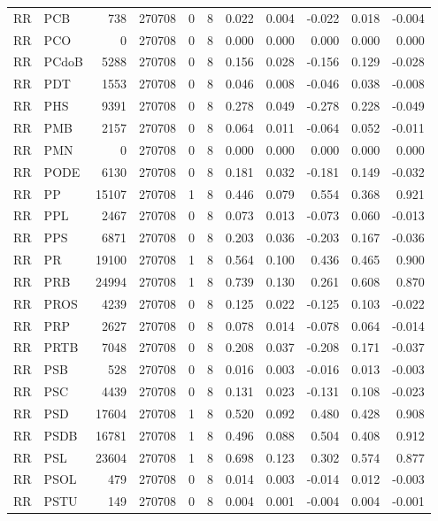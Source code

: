\begin{landscape}
\begin{longtable}{llrrrrrrrrr}
RR & PCB & 738 & 270708 & 0 & 8 & 0.022 & 0.004 & -0.022 & 0.018 & -0.004 \\
RR & PCO & 0 & 270708 & 0 & 8 & 0.000 & 0.000 & 0.000 & 0.000 & 0.000 \\
RR & PCdoB & 5288 & 270708 & 0 & 8 & 0.156 & 0.028 & -0.156 & 0.129 & -0.028 \\
RR & PDT & 1553 & 270708 & 0 & 8 & 0.046 & 0.008 & -0.046 & 0.038 & -0.008 \\
RR & PHS & 9391 & 270708 & 0 & 8 & 0.278 & 0.049 & -0.278 & 0.228 & -0.049 \\
RR & PMB & 2157 & 270708 & 0 & 8 & 0.064 & 0.011 & -0.064 & 0.052 & -0.011 \\
RR & PMN & 0 & 270708 & 0 & 8 & 0.000 & 0.000 & 0.000 & 0.000 & 0.000 \\
RR & PODE & 6130 & 270708 & 0 & 8 & 0.181 & 0.032 & -0.181 & 0.149 & -0.032 \\
RR & PP & 15107 & 270708 & 1 & 8 & 0.446 & 0.079 & 0.554 & 0.368 & 0.921 \\
RR & PPL & 2467 & 270708 & 0 & 8 & 0.073 & 0.013 & -0.073 & 0.060 & -0.013 \\
RR & PPS & 6871 & 270708 & 0 & 8 & 0.203 & 0.036 & -0.203 & 0.167 & -0.036 \\
RR & PR & 19100 & 270708 & 1 & 8 & 0.564 & 0.100 & 0.436 & 0.465 & 0.900 \\
RR & PRB & 24994 & 270708 & 1 & 8 & 0.739 & 0.130 & 0.261 & 0.608 & 0.870 \\
RR & PROS & 4239 & 270708 & 0 & 8 & 0.125 & 0.022 & -0.125 & 0.103 & -0.022 \\
RR & PRP & 2627 & 270708 & 0 & 8 & 0.078 & 0.014 & -0.078 & 0.064 & -0.014 \\
RR & PRTB & 7048 & 270708 & 0 & 8 & 0.208 & 0.037 & -0.208 & 0.171 & -0.037 \\
RR & PSB & 528 & 270708 & 0 & 8 & 0.016 & 0.003 & -0.016 & 0.013 & -0.003 \\
RR & PSC & 4439 & 270708 & 0 & 8 & 0.131 & 0.023 & -0.131 & 0.108 & -0.023 \\
RR & PSD & 17604 & 270708 & 1 & 8 & 0.520 & 0.092 & 0.480 & 0.428 & 0.908 \\
RR & PSDB & 16781 & 270708 & 1 & 8 & 0.496 & 0.088 & 0.504 & 0.408 & 0.912 \\
RR & PSL & 23604 & 270708 & 1 & 8 & 0.698 & 0.123 & 0.302 & 0.574 & 0.877 \\
RR & PSOL & 479 & 270708 & 0 & 8 & 0.014 & 0.003 & -0.014 & 0.012 & -0.003 \\
RR & PSTU & 149 & 270708 & 0 & 8 & 0.004 & 0.001 & -0.004 & 0.004 & -0.001 \\

\end{longtable}
\end{landscape}
